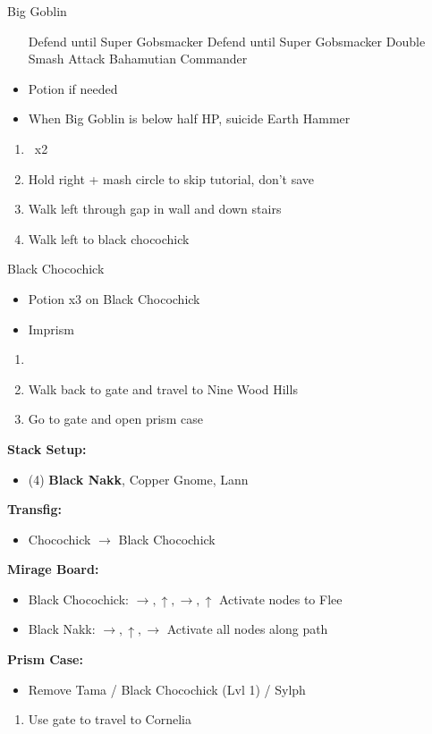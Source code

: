 \begin{battle}[]{Big Goblin}
	\begin{itemize}
		\lannf Defend until Super Gobsmacker
		\reynnf Defend until Super Gobsmacker
		\lannf Double Smash
		\reynnf Attack Bahamutian Commander
		\item Potion \reynn if needed
		\item When Big Goblin is below half HP, suicide \lann
		\reynnf Earth Hammer
	\end{itemize}
\end{battle}
\begin{enumerate}[resume]
	\item \cs\ x2
	\item Hold right + mash circle to skip tutorial, don't save
	\item Walk left through gap in wall and down stairs
	\item Walk left to black chocochick
\end{enumerate}
\begin{battle}[]{Black Chocochick}
	\begin{itemize}
		\item Potion x3 on Black Chocochick
		\item Imprism
	\end{itemize}
\end{battle}
\begin{enumerate}[resume]
	\item {}
	\item Walk back to gate and travel to Nine Wood Hills
	\item Go to gate and open prism case
\end{enumerate}
\begin{menu}
	\textbf{Stack Setup:}
	\begin{itemize}
		\item (4) \textbf{Black Nakk}, Copper Gnome, Lann
	\end{itemize}
	\textbf{Transfig:}
	\begin{itemize}
		\item Chocochick $\rightarrow$ Black Chocochick
	\end{itemize}
	\textbf{Mirage Board:}
	\begin{itemize}
		\item Black Chocochick: $\rightarrow,\uparrow,\rightarrow,\uparrow$ Activate nodes to Flee
		\item Black Nakk: $\rightarrow,\uparrow,\rightarrow$ Activate all nodes along path
	\end{itemize}
	\textbf{Prism Case:}
	\begin{itemize}
		\item Remove Tama / Black Chocochick (Lvl 1) / Sylph
	\end{itemize}
\end{menu}
\begin{enumerate}[resume]
	\item  Use gate to travel to Cornelia
\end{enumerate}